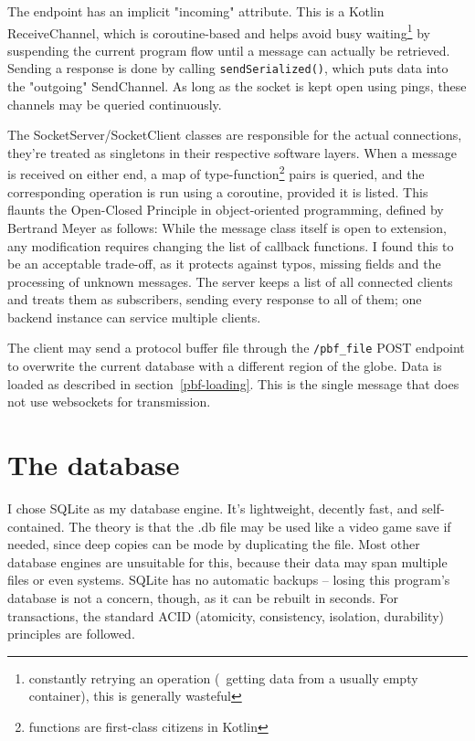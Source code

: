 The endpoint has an implicit "incoming" attribute. This is a Kotlin ReceiveChannel, which is coroutine-based and helps avoid busy waiting\footnote{constantly retrying an operation (\eg~getting data from a usually empty container), this is generally wasteful} by suspending the current program flow until a message can actually be retrieved. Sending a response is done by calling \verb|sendSerialized()|, which puts data into the "outgoing" SendChannel. As long as the socket is kept open using pings, these channels may be queried continuously.

The SocketServer/SocketClient classes are responsible for the actual connections, they're treated as singletons in their respective software layers. When a message is received on either end, a map of type-function\footnote{functions are first-class citizens in Kotlin} pairs is queried, and the corresponding operation is run using a coroutine, provided it is listed. This flaunts the Open-Closed Principle in object-oriented programming, defined by Bertrand Meyer\cite{OOSC-OCP} as follows:  While the message class itself is open to extension, any modification requires changing the list of callback functions. I found this to be an acceptable trade-off, as it protects against typos, missing fields and the processing of unknown messages.
The server keeps a list of all connected clients and treats them as subscribers, sending every response to all of them; one backend instance can service multiple clients.

\label{file-upload}
The client may send a protocol buffer file through the \verb|/pbf_file| POST endpoint to overwrite the current database with a different region of the globe. Data is loaded as described in section~\ref{pbf-loading}. This is the single message that does not use websockets for transmission.

\section{The database}

I chose SQLite as my database engine. It's lightweight, decently fast, and self-contained. The theory is that the .db file may be used like a video game save if needed, since deep copies can be mode by duplicating the file. Most other database engines are unsuitable for this, because their data may span multiple files or even systems. SQLite has no automatic backups -- losing this program's database is not a concern, though, as it can be rebuilt in seconds. For transactions, the standard ACID (atomicity, consistency, isolation, durability) principles are followed.


